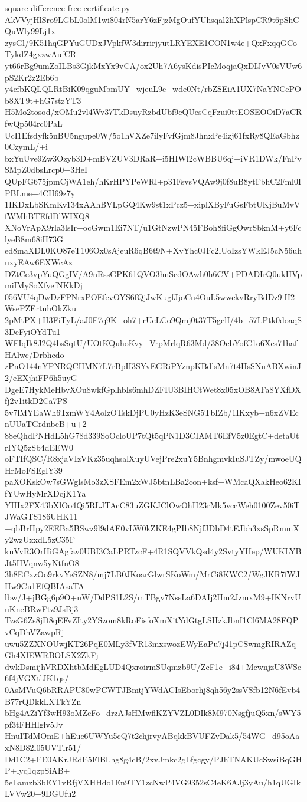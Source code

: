 \documentclass[11pt]{article}
\theoremstyle{definition}
\theoremstyle{remark}
\begin{document}
\begin{filecontents*}[overwrite]{square-difference-free-certificate.py}
AkVVyjHlSro9LGbL0olM1wi804rN5arY6zFjzMgOufYUhsqal2hXPlspCR9t6pShCQuWly99Lj1x
zysGl/9K51hqGPYuGUDxJVpkfW3dirrirjyutLRYEXE1CON1w4e+QxFxqqGCoTykdZ4gxzwAufCR
yt66rBg9umZoILBs3GjkMxYx9vCA/ox2Uh7A6ysKdisPIcMoqjaQxDIJvV0sVUw6pS2Kr2z2Eb6b
y4cfbKQLQLRtBiK09qguMbmUY+wjeuL9e+wde0Nt/rbZSEiA1UX7NaYNCePOb8XT9t+hG7stzYT3
H5Mo2tosod/xOMu2vl4Wv37TkDsuyRzbdUbf9cQUesCqFzui0ttEOSEOOiD7aCRfwQp504rc0PaL
UcI1Efsdyfk5nBU5ngupe0W/5o1hVXZe7ilyFvfGjm8JhnxPe4izj61fxRy8QEaGbhz0CzymL/+i
bxYuUve9Zw3Ozyb3D+mBVZUV3DRaR+i5HIWl2cWBBU6qj+iVR1DWk/FnPvSMpZ0dbsLrcp0+3HeI
QUpFG675jpmCjWA1eh/hKrHPYPeWRl+p31FsvsVQAw9j0f8uB8ytFbhC2Fml0IPBLme+4CH69z7y
1IKDxLbSKmKv134xAAhBVLpGQ4Kw9st1xPcz5+xiplXByFuGsFbtUKjBuMvVfWMhBTEfdDlWIXQ8
XNoVrApX9rla3lsIr+ocGwm1Ei7NT/u1GtNzwPN45FBoh8fiGgOwrSbknM+y6FclyeB8m68iH73G
ed8maXDL0KO87eT106Ox0sAjeuR6qB6t9N+XvYhc0JFc2lUoIzsYWkEJ5cN56uhuxyEAw6EXWcAz
DZtCe3vpYuQGgIV/A9nRssGPK61QVO3hnScdOAwh0h6CV+PDADIrQ0ukHVpmiIMySoXfyefNKkDj
056VU4qDwDzFPNrxPOEfevOYS6fQjJwKugfJjoCu4OuL5wwckvRryBdDz9iH2WsePZErtuhOkZku
2pMtPX+H3FiTyL/aJ0F7q9K+oh7+rUcLCo9Qmj0t37T5gclI/4b+57LPtk0doaqS3DeFyiOYdTu1
WFIqIk8J2Q4bsSqtU/UOtKQuhoKvy+VrpMrlqR63Md/38OcbYofC1o6Xes71hafHAlwc/Drbhcdo
zPnO144nYPNRQCHMN7L7rBpII3SYvEGRiPYznpKBdlsMn7t4HsSNuABXwinJ2/eEXjhiFP6h5uyG
DgeE7HykMeHbvXOu8wkfGplhbIs6mhDZFIU3BIHCtWet8x05xOB8AFa8YXfDXfj2v1itkD2Ca7PS
5v7lMYEaWh6TzmWY4AolzOTskDjPU0yHzK3eSNG5TbIZb/1IKxyb+n6xZVEcnUUaTGrdnbeB+u+2
88eQhdPNHdL5hG78d339SoOcloUP7tQt5qPN1D3CIAMT6EfV5z0EgtC+detaUtrIYQ5zSb4dEEW0
oFTIfQSC/R8xjaVIzVKz35uqhsalXuyUVejPre2xuY5BnhgmvkIuSJTZy/mwoeUQHrMoFSEglY39
paXOKskOw7sGWglsMo3zXSFEm2xWJ5btnLBa2con+ksf+WMcaQXakHeo62KIfYUwHyMrXDcjK1Ya
YIHx2FX43bXlOo4Qi5RLJTAcC83uZGKJClOwOhH23rMk5vccWeh0100Zev50iTJWaGTS186UHK11
+qbBrHpy2EEBa5BSwz9l9dAE0vLW0kZKE4gPIb8NjfJDbD4tEJbh3xsSpRmmXy2wzUxxdL5zC35F
kuVvR3OrHiGAgfav0UBI3CaLPRTzcF+4R1SQVVkQsd4y2SvtyYHep/WUKLYBJt5HVqnw5yNtfnO8
3h8ECxzOo9rkvYeSZN8/mj7LB0JKoarGlwrSKoWm/MrCi8KWC2/WgJKR7fWJHw9Cu1EfQBIAsaTA
lbw/J+jBGg6p9O+uW/DdPS1L2S/mTBgv7NssLa6DAIj2Hm2JzmxM9+IKNrvUuKneBRwFtz9JsBj3
TzsG6Zs8jD8qEFvZIty2YSzom8kRoFisfoXmXitYdGtgLSHzkJbnI1Cl6MA28FQPvCqDhVZawpRj
uwu5ZZXNOUwjKT26PqE0MLy3fVR13mxswozEWyEaPu7j41pCSwmgRIRAZqGh4XlEWRBOLSX2ZkFj
dwkDsmijhVRDXhtbMdEgLUD4QxroirmSUqmzb9U/ZcF1e+i84+McwnjzU8WSc6f4jVGXtlJK1qs/
0AsMVuQ6bRRAPU80wPCWTJBmtjYWdACIsEborhj8qh56y2ssVSfb12N6fEvb4B77rQDkkLXTkYZn
bHg4AZiYf3wH93oMZcFo+drzAJsHMwflKZYVZL0DIk8M970NsgfjuQ5xn/sWY5pf3tFHHlglv5Jv
HnuITdMOmE+hEue6UWYu5cQ7t2chjrvyABqkkBVUFZvDak5/54WG+d95oAaxN8D82l05UVTlr51/
Dd1C2+FE0AKrJRdE5FlBLhg8g4cB/2xvJmkc2gLfgcgy/PJhTNAKUcSwsiBqGHP+lyq1qzpSiAB+
5eLamzb3bEY1vRfjVXHHdo1En9TY1zcNwP4VG9352sC4eK6AJj3yAu/h1qUGIkLVVw20+9DGUfu2

\end{filecontents*}
\end{document}
